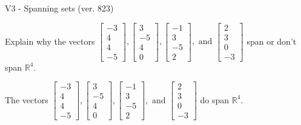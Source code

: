 \begin{exercise}
  \begin{exerciseTitle}V3 - Spanning sets (ver. 823)\end{exerciseTitle}
  \begin{exerciseStatement}
    Explain why the vectors \(\left[\begin{array}{r}
-3 \\
4 \\
4 \\
-5
\end{array}\right] , \left[\begin{array}{r}
3 \\
-5 \\
4 \\
0
\end{array}\right] , \left[\begin{array}{r}
-1 \\
3 \\
-5 \\
2
\end{array}\right] , \text{ and } \left[\begin{array}{r}
2 \\
3 \\
0 \\
-3
\end{array}\right]\) span or don't span \(\mathbb{R}^4\). 
	


  \end{exerciseStatement}
  \begin{exerciseAnswer}
   The vectors \(\left[\begin{array}{r}
-3 \\
4 \\
4 \\
-5
\end{array}\right] , \left[\begin{array}{r}
3 \\
-5 \\
4 \\
0
\end{array}\right] , \left[\begin{array}{r}
-1 \\
3 \\
-5 \\
2
\end{array}\right] , \text{ and } \left[\begin{array}{r}
2 \\
3 \\
0 \\
-3
\end{array}\right]\) 
  	 do  
	span \(\mathbb{R}^4\).
  


  \end{exerciseAnswer}
\end{exercise}